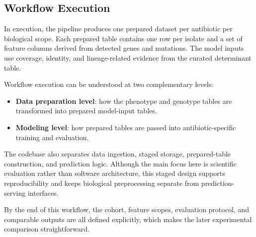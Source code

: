 \subsection{Workflow Execution}

In execution, the pipeline produces one prepared dataset per antibiotic per biological scope. Each prepared table contains one row per isolate and a set of feature columns derived from detected genes and mutations. The model inputs use coverage, identity, and lineage-related evidence from the curated determinant table.

Workflow execution can be understood at two complementary levels:

\begin{itemize}
    \item \textbf{Data preparation level}: how the phenotype and genotype tables are transformed into prepared model-input tables.
    \item \textbf{Modeling level}: how prepared tables are passed into antibiotic-specific training and evaluation.
\end{itemize}

The codebase also separates data ingestion, staged storage, prepared-table construction, and prediction logic. Although the main focus here is scientific evaluation rather than software architecture, this staged design supports reproducibility and keeps biological preprocessing separate from prediction-serving interfaces.

By the end of this workflow, the cohort, feature scopes, evaluation protocol, and comparable outputs are all defined explicitly, which makes the later experimental comparison straightforward.
